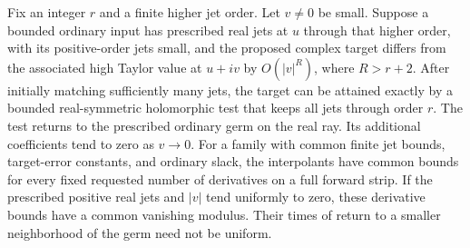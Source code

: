 \begin{lemma}
\label{lem:calculus-interpolation}
Fix an integer $r$ and a finite higher jet order.  Let $v\ne0$ be small.
Suppose a bounded ordinary input has prescribed real jets at $u$ through
that higher order, with its positive-order jets small, and the proposed
complex target differs from the associated high Taylor value at $u+iv$
by $O(|v|^R)$, where $R>r+2$.  After initially matching sufficiently many
jets, the target can be attained exactly by a bounded real-symmetric
holomorphic test that keeps all jets through order $r$.  The test returns
to the prescribed ordinary germ on the real ray.  Its additional
coefficients tend to zero as $v\to0$.
For a family with common finite jet bounds, target-error constants, and
ordinary slack, the interpolants have common bounds for every fixed
requested number of derivatives on a full forward strip.  If the prescribed
positive real jets and $|v|$ tend uniformly to zero, these derivative
bounds have a common vanishing modulus.  Their times of return to a
smaller neighborhood of the germ need not be uniform.
\end{lemma}

